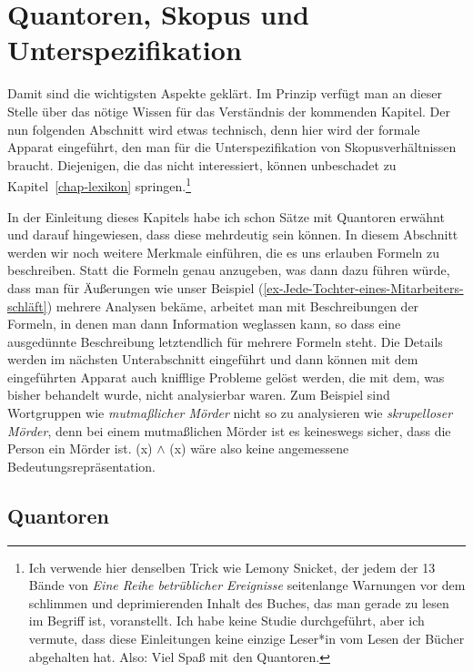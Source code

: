\section{Quantoren, Skopus und Unterspezifikation}
\label{sec-Skopus}

Damit sind die wichtigsten Aspekte geklärt. Im Prinzip verfügt man an dieser Stelle über das nötige
Wissen für das Verständnis der kommenden Kapitel. Der nun folgenden Abschnitt wird etwas technisch,
denn hier wird der formale Apparat eingeführt, den man für die Unterspezifikation von
Skopusverhältnissen braucht. Diejenigen, die das nicht interessiert, können unbeschadet zu
Kapitel~\ref{chap-lexikon} springen.\footnote{
  Ich verwende hier denselben Trick wie Lemony Snicket, der jedem der 13 Bände von \emph{Eine Reihe
    betrüblicher Ereignisse} seitenlange Warnungen vor dem schlimmen und deprimierenden Inhalt des
  Buches, das man gerade zu lesen im Begriff ist, voranstellt. Ich habe keine Studie durchgeführt,
  aber ich vermute, dass diese Einleitungen keine einzige Leser*in vom Lesen der Bücher abgehalten
  hat. Also: Viel Spaß mit den Quantoren.
}

In der Einleitung dieses Kapitels habe ich schon Sätze mit Quantoren erwähnt und darauf hingewiesen,
dass diese mehrdeutig sein können. In diesem Abschnitt werden wir noch weitere Merkmale einführen,
die es uns erlauben Formeln zu beschreiben. Statt die Formeln genau anzugeben, was dann dazu führen
würde, dass man für Äußerungen wie unser Beispiel (\ref{ex-Jede-Tochter-eines-Mitarbeiters-schläft})
mehrere Analysen bekäme, arbeitet man mit Beschreibungen der Formeln, in denen man dann Information
weglassen kann, so dass eine ausgedünnte Beschreibung letztendlich für mehrere Formeln steht. Die Details
werden im nächsten Unterabschnitt eingeführt und dann können mit dem eingeführten Apparat auch
knifflige Probleme gelöst werden, die mit dem, was bisher behandelt wurde, nicht analysierbar waren. Zum
Beispiel sind Wortgruppen wie \emph{mutmaßlicher Mörder} nicht so zu analysieren wie
\emph{skrupelloser Mörder}, denn bei einem mutmaßlichen Mörder ist es keineswegs sicher, dass die
Person ein Mörder ist. (x) $\wedge$ (x) wäre also keine
angemessene Bedeutungsrepräsentation. 

\subsection{Quantoren}

